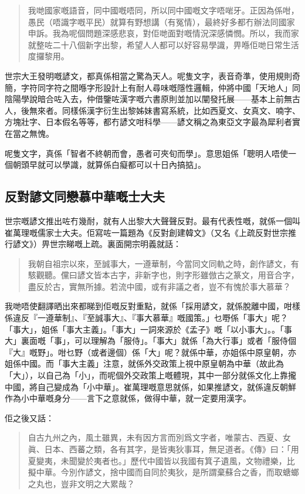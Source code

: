 \begin{quotation}
  我哋國家嘅語音，同中國嘅唔同，所以同中國嘅文字唔啱牙。正因為係咁，愚民（唔識字嘅平民）就算有野想講（有冤情），最終好多都冇辦法同國家申訴。我為呢個問題深感悲哀，對佢哋面對嘅情況深感憐憫。所以，我而家就整咗二十八個新字出黎，希望人人都可以好容易學識，畀喺佢哋日常生活度攞黎用。
\end{quotation}

世宗大王發明嘅諺文，都真係相當之驚為天人。呢隻文字，表音奇準，使用規則奇簡，字符同字符之間喺字形設計上有耐人尋味嘅隱性邏輯，仲將中國「天地人」同陰陽學說暗合咗入去，仲借鑒咗漢字嘅六書原則並加以闡發托展——基本上前無古人，後無來者。同樣係漢字衍生出黎姊妹書寫系統，比如西夏文、女真文、喃字、方塊壯字、日本假名等等，都冇諺文咁科學——諺文稱之為東亞文字最為犀利者實在當之無愧。

呢隻文字，真係「智者不終朝而會，愚者可夾旬而學」。意思姐係「聰明人唔使一個朝頭早就可以學識，就算係白癡都可以十日內搞掂」。

\subsection*{反對諺文同戀慕中華嘅士大夫}
世宗嘅諺文推出咗冇幾耐，就有人出黎大大聲聲反對。最有代表性嘅，就係一個叫崔萬理嘅儒家士大夫。佢寫咗一篇題為《反對創建韓文》（又名《上疏反對世宗推行諺文》）畀世宗睇嘅上疏。裏面開宗明義就話：
\begin{quotation}
  我朝自祖宗以來，至誠事大，一遵華制，今當同文同軌之時，創作諺文，有駭觀聽。儻曰諺文皆本古字，非新字也，則字形雖倣古之篆文，用音合字，盡反於古，實無所據。若流中國，或有非議之者，豈不有愧於事大慕華？
\end{quotation}

我哋唔使翻譯晒出來都睇到佢嘅反對重點，就係「採用諺文，就係脫離中國，咁樣係違反『一遵華制』、『至誠事大』、『事大慕華』嘅國策。」乜嘢係「事大」呢？「事大」，姐係「事大主義」。「事大」一詞來源於《孟子》嘅「以小事大」。。「事大」裏面嘅「事」，可以理解為「服侍」。「事大」就係「為大行事」或者「服侍個『大』嘅野」。咁乜野（或者邊個）係「大」呢？就係中華，亦姐係中原皇朝，亦姐係中國。而「事大主義」注意，就係外交政策上視中原皇朝為中華（故此為「大」），以自己為「小」，而呢個外交政策上嘅體現，其中一部分就係文化上靠攏中國，將自己變成為「小中華」。崔萬理嘅意思就係，如果推諺文，就係違反朝鮮作為小中華嘅身分——言下之意就係，做得中華，就一定要用漢字。

佢之後又話：

\begin{quotation}
  自古九州之內，風土雖異，未有因方言而別爲文字者，唯蒙古、西夏、女眞、日本、西蕃之類，各有其字，是皆夷狄事耳，無足道者。《傳》曰：「用夏變夷，未聞變於夷者也。」歷代中國皆以我國有箕子遺風，文物禮樂，比擬中華。今別作諺文，捨中國而自同於夷狄，是所謂棄蘇合之香，而取螗螂之丸也，豈非文明之大累哉？
\end{quotation}

